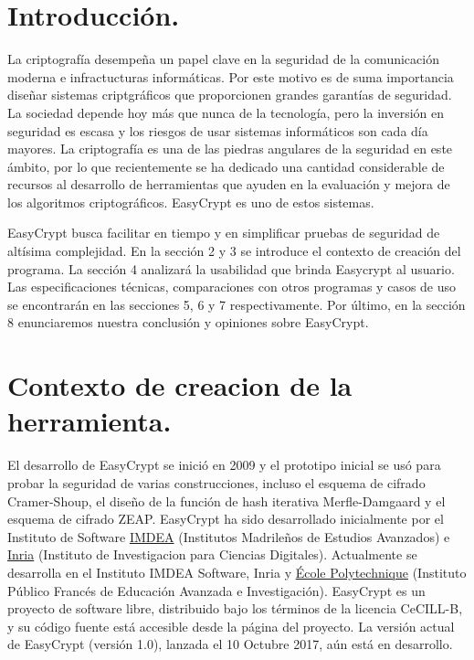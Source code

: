 \documentclass[runningheads,a4paper]{llncs}
\begin{document}
\section{Introducción.}
La criptografía desempeña un papel clave en la seguridad de la comunicación moderna e infractucturas informáticas.  Por este motivo es de suma importancia diseñar sistemas criptgráficos que proporcionen grandes garantías de seguridad.
La sociedad depende hoy más que nunca de la tecnología, pero la inversión en seguridad es escasa y los riesgos de usar sistemas informáticos son cada día mayores. La criptografía es una de las piedras angulares de la seguridad en este  ámbito, por lo que recientemente se ha dedicado una cantidad considerable de recursos al desarrollo de herramientas que ayuden en la evaluación y mejora de los algoritmos criptográficos. EasyCrypt es uno de estos sistemas.

EasyCrypt busca facilitar en tiempo y en simplificar pruebas de seguridad de altísima complejidad. En la sección 2 y 3 se introduce el contexto de creación del programa. La sección 4 analizará la usabilidad que brinda Easycrypt al usuario. Las especificaciones técnicas, comparaciones con otros programas y casos de uso se encontrarán en las secciones 5, 6 y 7 respectivamente. Por último, en la sección 8 enunciaremos nuestra conclusión y opiniones sobre EasyCrypt.
    
\section{Contexto de creacion de la herramienta.}
El desarrollo de EasyCrypt se inició en 2009 y el prototipo inicial se usó para probar la seguridad de varias construcciones, incluso el esquema de cifrado Cramer-Shoup, el diseño de la función de hash iterativa Merfle-Damgaard y el esquema de cifrado ZEAP. EasyCrypt ha sido desarrollado inicialmente por el Instituto de Software \href{http://www.imdea.org/es}{IMDEA} (Institutos Madrileños de Estudios Avanzados) e \href{https://www.inria.fr/en/}{Inria} (Instituto de Investigacion para Ciencias Digitales). Actualmente se desarrolla en el Instituto IMDEA Software, Inria y \href{https://www.polytechnique.edu/}{École Polytechnique} (Instituto Público Francés de Educación Avanzada e Investigación). EasyCrypt es un proyecto de software libre, distribuido bajo los términos de la licencia CeCILL-B, y su código fuente está accesible desde la página del proyecto. 
La versión actual de EasyCrypt (versión 1.0), lanzada el 10 Octubre 2017, aún está en desarrollo. 
\cite{article2}
\end{document}
